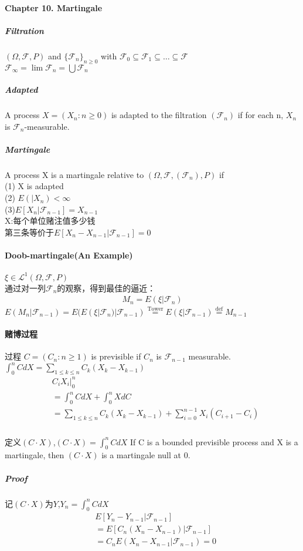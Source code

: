 \documentclass[UTF8]{ctexart}
\theoremstyle{definition}
\begin{document}
\paragraph{Chapter 10. Martingale}
\subparagraph{Filtration} $(\Omega,\mathcal{F},P)$ and $\{ \mathcal{F}_n \}_{n\geq 0}$ with $\mathcal{F}_0 \subseteq \mathcal{F}_1 \subseteq \dots \subseteq \mathcal{F}$\\
$\mathcal{F}_{\infty} = \lim\mathcal{F}_n = \bigcup \mathcal{F}_n$\\
\subparagraph{Adapted}A process $X = (X_n:n\geq 0)$ is adapted to the filtration $(\mathcal{F}_n)$ if for each n, $X_n$ is $\mathcal{F}_n$-measurable.\\
\subparagraph{Martingale}A process X is a martingale relative to $(\Omega,\mathcal{F},(\mathcal{F}_n),P)$ if\\
(1) X is adapted\\
(2) $E(|X_n) < \infty$\\
(3)$E[X_n|\mathcal{F}_{n-1}] = X_{n-1}$\\
X:每个单位赌注值多少钱\\
第三条等价于$E[X_n - X_{n-1}|\mathcal{F}_{n-1}] =0$\\
\paragraph{Doob-martingale(An Example)} $\xi \in \mathcal{L}^1(\Omega,\mathcal{F},P) $\\
通过对一列$\mathcal{F}_n$的观察，得到最佳的逼近：\\
\begin{align*}
	M_n = E(\xi|\mathcal{F}_n)
\end{align*}
$E(M_n|\mathcal{F}_{n-1}) = E(E(\xi|\mathcal{F}_{n})|\mathcal{F}_{n-1}) \overset{\text{Tower}}{=} E(\xi|\mathcal{F}_{n-1}) \overset{\text{def}}{=}  M_{n-1} $\\

\paragraph{赌博过程}过程 $C = (C_n: n\geq1)$ is previsible if $C_n$ is $\mathcal{F}_{n-1}$ measurable.\\
$\int_0^nCdX = \sum_{1\leq k \leq n}C_k(X_k-X_{k-1})$\\
\begin{align*}
&C_iX_i |_0^n \\&= \int_0^nCdX + \int_0^nXdC \\&= \sum_{1\leq k \leq n}C_k(X_k-X_{k-1}) + \sum_{i=0}^{n-1}X_i(C_{i+1}-C_i)
\end{align*}
\subparagraph{}定义$(C\cdot X)$,$(C\cdot X) = \int_0^n CdX$ If C is a bounded previsible process and X is a martingale, then $(C\cdot X)$ is a martingale null at 0.\\
\subparagraph{Proof} 记$(C\cdot X)$为$Y$,$Y_n = \int_0^nCdX$
\begin{align*}
&E[Y_n - Y_{n-1}|\mathcal{F}_{n-1}]\\& = E[C_n(X_n - X_{n-1})|\mathcal{F}_{n-1}] \\&= C_nE(X_n-X_{n-1}|\mathcal{F}_{n-1}) = 0
\end{align*}
\end{document}
